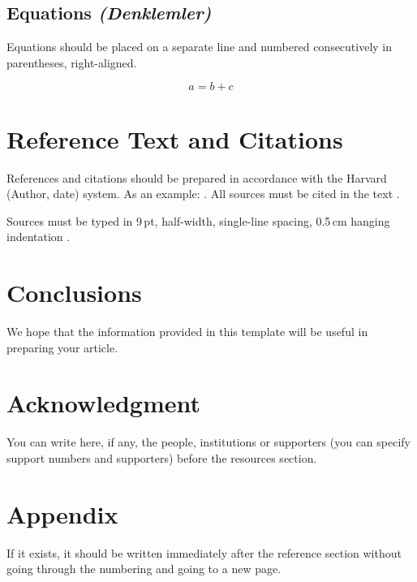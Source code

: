 \documentclass[10pt,a4paper,twocolumn]{article}
\begin{document}
\subsection{Equations \normalfont\textit{(Denklemler)}}

Equations should be placed on a separate line and numbered
consecutively in parentheses, right-aligned.

\begin{equation}
  a = b + c
\end{equation}

\section{Reference Text and Citations}

References and citations should be prepared in accordance with the
Harvard (Author, date) system. As an example:
\parencite{Surname1Surname22013}. All sources must be cited in the
text \parencite{Surname1etal2010}.

Sources must be typed in 9\,pt, half-width, single-line spacing,
0.5\,cm hanging indentation \parencite{Yilmaz2012}.

\section{Conclusions}

We hope that the information provided in this template will be useful
in preparing your article.

\section*{Acknowledgment}

You can write here, if any, the people, institutions or supporters
(you can specify support numbers and supporters) before the resources
section.

\printbibliography[title={References}]

\section*{Appendix}

If it exists, it should be written immediately after the reference
section without going through the numbering and going to a new page.
\end{document}
